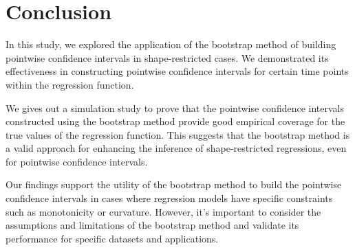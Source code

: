 \documentclass[12pt]{article}
\begin{document}
\section{Conclusion}
\label{Conclusion}
In this study, we explored the application of the bootstrap method of building pointwise confidence intervals in shape-restricted cases. We demonstrated its effectiveness in constructing pointwise confidence intervals for certain time points within the regression function. 

We gives out a simulation study to prove that the pointwise confidence intervals constructed using the bootstrap method provide good empirical coverage for the true values of the regression function. This suggests that the bootstrap method is a valid approach for enhancing the inference of shape-restricted regressions, even for pointwise confidence intervals.

Our findings support the utility of the bootstrap method to build the pointwise confidence intervals in cases where regression models have specific constraints such as monotonicity or curvature. However, it's important to consider the assumptions and limitations of the bootstrap method and validate its performance for specific datasets and applications.



\end{document}
